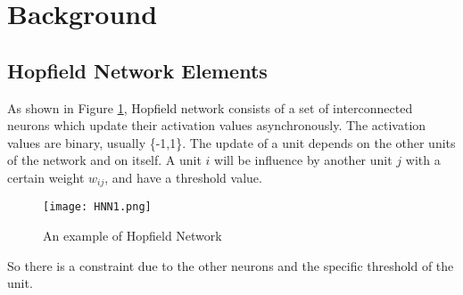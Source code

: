 \section{Background}
\subsection{Hopfield Network Elements}
As shown in Figure \ref{fg:HNN1}, Hopfield network consists of a set of interconnected neurons which update their activation values asynchronously. The activation values are binary, usually \{-1,1\}. The update of a unit depends on the other units of the network and on itself. A unit $i$ will be influence by another unit $j$ with a certain weight $w_{ij}$, and have a threshold value.\\

\begin{figure}[h]
\centering
\texttt{[image: HNN1.png]}
\caption{An example of Hopfield Network}
\label{fg:HNN1}
\end{figure}

So there is a constraint due to the other neurons and the specific threshold of the unit.\\

